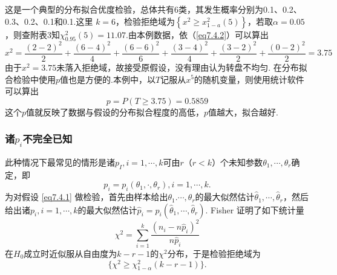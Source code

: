 \begin{solution}
这是一个典型的分布拟合优度检验，总体共有6类，其发生概率分别为0.1、0.2、0.3、0.2、0.1和0.1.这里 $k=6$，检验拒绝域为$\left\{ x ^ { 2 } \geq x _ { 1 - a } ^ { 2 } ( 5 ) \right\}$，若取$\alpha=0.05$，则查附表3知$\chi _ { 0.95 } ^ { 2 } ( 5 ) = 11.07$.由本例数据，依（\ref{eq7.4.2}）可以算出
\[x ^ { 2 } = \frac { ( 2 - 2 ) ^ { 2 } } { 2 } + \frac { ( 6 - 4 ) ^ { 2 } } { 4 } + \frac { ( 6 - 6 ) ^ { 2 } } { 6 } + \frac { ( 3 - 4 ) ^ { 2 } } { 4 } +\frac { ( 3 - 2 ) ^ { 2 } } { 2 } + \frac { ( 0 - 2 ) ^ { 2 } } { 2 } = 3.75\]
由于$x ^ { 2 } = 3.75$未落入拒绝域，故接受原假设，没有理由认为转盘不均匀.
在分布拟合检验中使用$p$值也是方便的.本例中，以$T$记服从$x ^ {5}$的随机变量，则使用统计软件可以算出
\[p = P ( T \geq 3.75 ) = 0.5859\]
这个$p$值就反映了数据与假设的分布拟合程度的高低，$p$值越大，拟合越好.
\end{solution}

\subsubsection{诸$p_i$不完全已知}
此种情况下最常见的情形是诸$p_I,i=1,\cdots,k$可由$r$（$r<k$）个未知参数$\theta_1,\cdots,\theta_r$确定，即
\[
  p_i = p_i(\theta_1,\cdot,\theta_r),i=1,\cdots,k.
\]
为对假设 \eqref{eq7.4.1} 做检验，首先由样本给出$\theta_1.\cdots,\theta_r$的最大似然估计$\hat\theta_1,\cdots,\hat\theta_r$，然后给出诸$p_i,i=1,\cdots,k$的最大似然估计$\hat p_i=p_i(\hat\theta_1,\cdots,\hat\theta_r)$. Fisher 证明了如下统计量
\begin{equation}\label{eq7.4.4}
  \chi^2 = \sum_{i=1}^k\frac{(n_i-n\hat p_i)^2}{n\hat p_i}
\end{equation}
在$H_0$成立时近似服从自由度为$k-r-1$的$\chi^2$分布，于是检验拒绝域为
\[
  \{ \chi^2 \ge \chi^2_{1-\alpha}(k-r-1) \}.
\]

